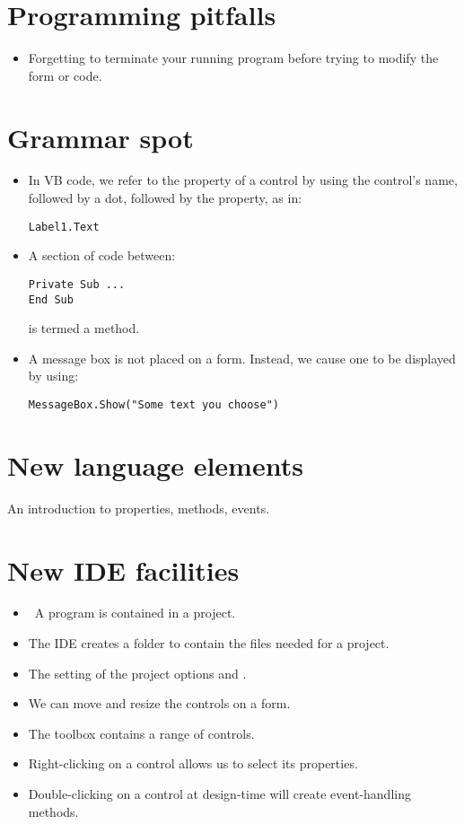 	\section{Programming pitfalls}
		\begin{itemize}
			\item Forgetting to terminate your running program before trying to modify the form or code.
		\end{itemize}

	\section{Grammar spot}
	\begin{itemize}
		\item In VB code, we refer to the property of a control by using the control’s name, followed by a dot, followed by the property, as in:
			\begin{lstlisting}
Label1.Text
			\end{lstlisting}
		\item A section of code between:
			\begin{lstlisting}
Private Sub ...
End Sub
			\end{lstlisting}
			is termed a method.
		\item A message box is not placed on a form. Instead, we cause one to be displayed by using:
			\begin{lstlisting}
MessageBox.Show("Some text you choose")
			\end{lstlisting}
		\end{itemize}

	\section{New language elements}
		An introduction to properties, methods, events.

	\section{New IDE facilities}
		\begin{itemize}
			\item A program is contained in a project.
			\item The IDE creates a folder to contain the files needed for a project.
			\item The setting of the project options  and .
			\item We can move and resize the controls on a form.
			\item The toolbox contains a range of controls.
			\item Right-clicking on a control allows us to select its properties.
			\item Double-clicking on a control at design-time will create event-handling methods.
		\end{itemize}

